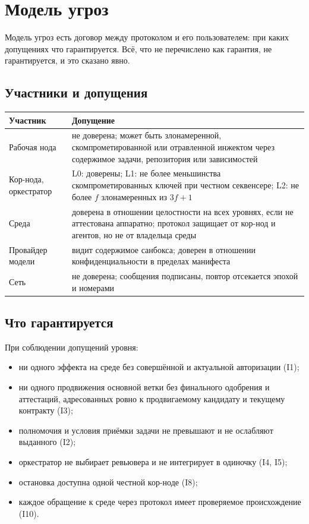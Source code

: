 \chapter{Модель угроз}

Модель угроз есть договор между протоколом и его пользователем: при каких допущениях что гарантируется. Всё, что не перечислено как гарантия, не гарантируется, и это сказано явно.

\section{Участники и допущения}

\begin{center}
\small
\begin{tabular}{p{3.2cm} p{10.4cm}}
\toprule
Участник & Допущение \\
\midrule
Рабочая нода & не доверена; может быть злонамеренной, скомпрометированной или отравленной инжектом через содержимое задачи, репозитория или зависимостей \\
Кор-нода, оркестратор & L0: доверены; L1: не более меньшинства скомпрометированных ключей при честном секвенсере; L2: не более $f$ злонамеренных из $3f+1$ \\
Среда & доверена в отношении целостности на всех уровнях, если не аттестована аппаратно; протокол защищает от кор-нод и агентов, но не от владельца среды \\
Провайдер модели & видит содержимое санбокса; доверен в отношении конфиденциальности в пределах манифеста \\
Сеть & не доверена; сообщения подписаны, повтор отсекается эпохой и номерами \\
\bottomrule
\end{tabular}
\end{center}

\section{Что гарантируется}

При соблюдении допущений уровня:

\begin{itemize}
\item ни одного эффекта на среде без совершённой и актуальной авторизации (I1);
\item ни одного продвижения основной ветки без финального одобрения и аттестаций, адресованных ровно к продвигаемому кандидату и текущему контракту (I3);
\item полномочия и условия приёмки задачи не превышают и не ослабляют выданного (I2);
\item оркестратор не выбирает ревьювера и не интегрирует в одиночку (I4, I5);
\item остановка доступна одной честной кор-ноде (I8);
\item каждое обращение к среде через протокол имеет проверяемое происхождение (I10).
\end{itemize}

